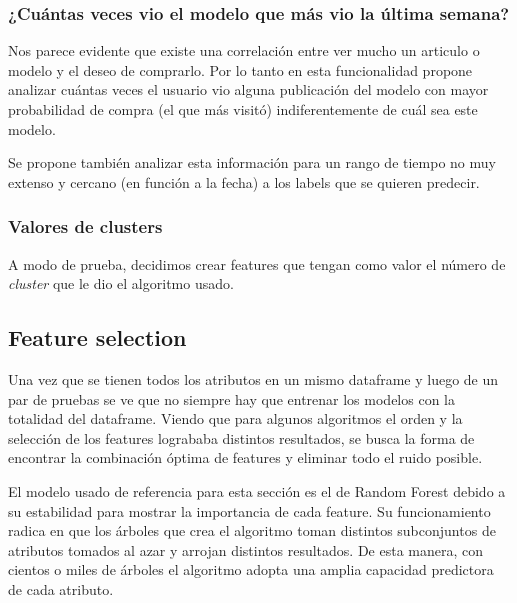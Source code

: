 \documentclass[a4paper]{article}
\begin{document}
\subsubsection{¿Cuántas veces vio el modelo que más vio la última semana?}

\begin{sloppypar}
	\texttt{}
\end{sloppypar}

Nos parece evidente que existe una correlación entre ver mucho un articulo o modelo y el deseo de comprarlo. Por lo tanto en esta funcionalidad propone analizar cuántas veces el usuario vio alguna publicación del modelo con mayor probabilidad de compra (el que más visitó) indiferentemente de cuál sea este modelo. 

Se propone también analizar esta información para un rango de tiempo no muy extenso y cercano (en función a la fecha) a los labels que se quieren predecir. 

\subsubsection{Valores de clusters}

\begin{sloppypar}
	\texttt{}
\end{sloppypar}

A modo de prueba, decidimos crear features que tengan como valor el número de \textit{cluster} que le dio el algoritmo usado.


\subsection{Feature selection}

Una vez que se tienen todos los atributos en un mismo dataframe y luego de un par de pruebas se ve que no siempre hay que entrenar los modelos con la totalidad del dataframe. Viendo que para algunos algoritmos el orden y la selección de los features logrababa distintos resultados, se busca la forma de encontrar la combinación óptima de features y eliminar todo el ruido posible.

El modelo usado de referencia para esta sección es el de Random Forest debido a su estabilidad para mostrar la importancia de cada feature. Su funcionamiento radica en que los árboles que crea el algoritmo toman distintos subconjuntos de atributos tomados al azar y arrojan distintos resultados. De esta manera, con cientos o miles de árboles el algoritmo adopta una amplia capacidad predictora de cada atributo.
\end{document}
